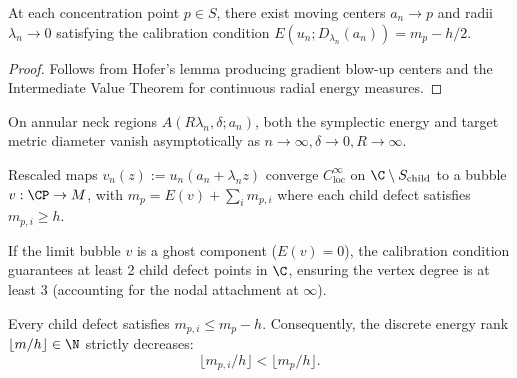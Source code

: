\begin{theorem}
\label{b02:calibration}
\leanok
{}
At each concentration point $p \in S$, there exist moving centers $a_n \to p$ and radii $\lambda_n \to 0$ satisfying the calibration condition $E(u_n; D_{\lambda_n}(a_n)) = m_p - h/2$.
\end{theorem}
\begin{proof}
\leanok
Follows from Hofer's lemma producing gradient blow-up centers and the Intermediate Value Theorem for continuous radial energy measures.
\end{proof}

\begin{theorem}
\label{b03:neck_vanishing}
On annular neck regions $A(R\lambda_n, \delta; a_n)$, both the symplectic energy and target metric diameter vanish asymptotically as $n \to \infty, \delta \to 0, R \to \infty$.
\end{theorem}

\begin{theorem}
\label{b04:one_level_decomp}
Rescaled maps $v_n(z) := u_n(a_n + \lambda_n z)$ converge $C^\infty_{\mathrm{loc}}$ on $\C \setminus S_{\mathrm{child}}$ to a bubble $v : \CP \to M$, with $m_p = E(v) + \sum_{i} m_{p, i}$ where each child defect satisfies $m_{p, i} \ge h$.
\end{theorem}

\begin{theorem}
\label{b05:ghost_branching}
If the limit bubble $v$ is a ghost component ($E(v) = 0$), the calibration condition guarantees at least 2 child defect points in $\C$, ensuring the vertex degree is at least 3 (accounting for the nodal attachment at $\infty$).
\end{theorem}

\begin{theorem}
\label{b06:rank_decrease}
Every child defect satisfies $m_{p, i} \le m_p - h$. Consequently, the discrete energy rank $\lfloor m / h \rfloor \in \N$ strictly decreases:
\[
\lfloor m_{p, i} / h \rfloor < \lfloor m_p / h \rfloor.
\]
\end{theorem}

